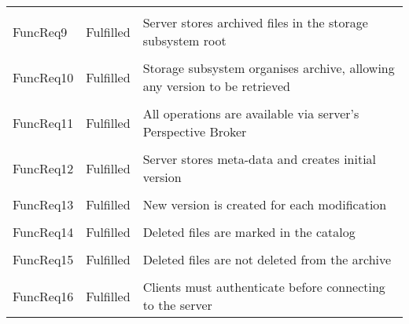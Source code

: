 \begin{longtable}{ l l p{5cm} }
    \\ \\
    FuncReq9            & Fulfilled                 & Server stores
                                                      archived files in the
                                                      storage subsystem
                                                      root
    \\ \\
    FuncReq10           & Fulfilled                 & Storage subsystem
                                                      organises archive,
                                                      allowing any version
                                                      to be retrieved
    \\ \\
    FuncReq11           & Fulfilled                 & All operations are
                                                      available via
                                                      server's Perspective
                                                      Broker
    \\ \\
    FuncReq12           & Fulfilled                 & Server stores
                                                      meta-data and creates
                                                      initial version
    \\ \\
    FuncReq13           & Fulfilled                 & New version is
                                                      created for each
                                                      modification
    \\ \\
    FuncReq14           & Fulfilled                 & Deleted files are
                                                      marked in the catalog
    \\ \\
    FuncReq15           & Fulfilled                 & Deleted files are not
                                                      deleted from the
                                                      archive
    \\ \\
    FuncReq16           & Fulfilled                 & Clients must
                                                      authenticate before
                                                      connecting to the
                                                      server

\end{longtable}
